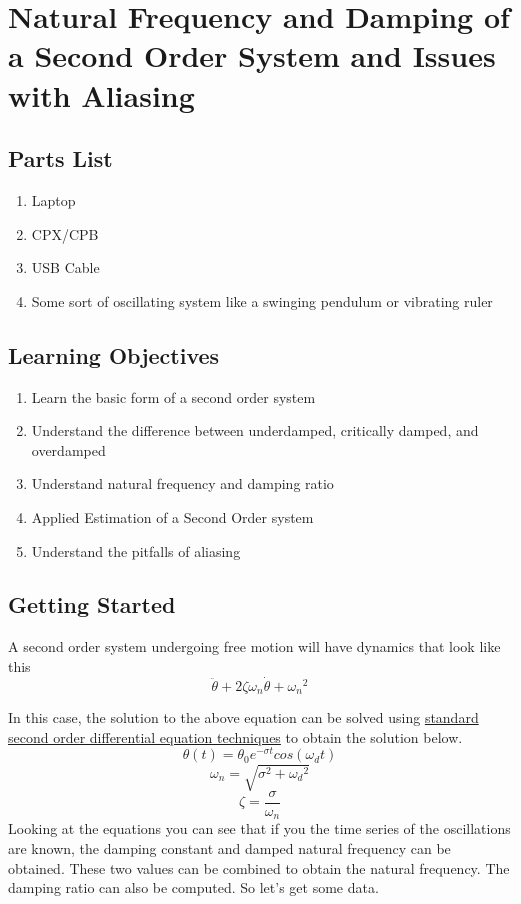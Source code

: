 \newpage

\section{Natural Frequency and Damping of a Second Order System and Issues with Aliasing}
\label{s:pendulum}

\subsection{Parts List}

\begin{enumerate}[itemsep=-5pt]
\item Laptop
\item CPX/CPB
\item USB Cable
\item Some sort of oscillating system like a swinging pendulum or vibrating ruler
\end{enumerate}

\subsection{Learning Objectives}
\begin{enumerate}[itemsep=-5pt]
\item Learn the basic form of a second order system
\item Understand the difference between underdamped, critically damped, and overdamped
\item Understand natural frequency and damping ratio
\item Applied Estimation of a Second Order system
\item Understand the pitfalls of aliasing
\end{enumerate}

\subsection{Getting Started}
A second order system undergoing free motion will have dynamics that look like this
\begin{equation}
\ddot{\theta} + 2\zeta \omega_n \dot{\theta} + {\omega_n}^2
\end{equation}

In this case, the solution to the above equation can be solved using \href{https://www.youtube.com/watch?v=VOv2HI3i7oo}{standard second order differential equation techniques} to obtain the solution below.
\begin{equation}
\theta(t) = \theta_0e^{-\sigma t}cos(\omega_d t)
\end{equation}
\begin{equation}
\omega_n = \sqrt{\sigma^2 + {\omega_d}^2}
\end{equation}
\begin{equation}
\zeta = \frac{\sigma}{\omega_n}
\end{equation}
Looking at the equations you can see that if you the time series of the oscillations are known, the damping constant and damped natural frequency can be obtained. These two values can be combined to obtain the natural frequency. The damping ratio can also be computed. So let’s get some data. 

